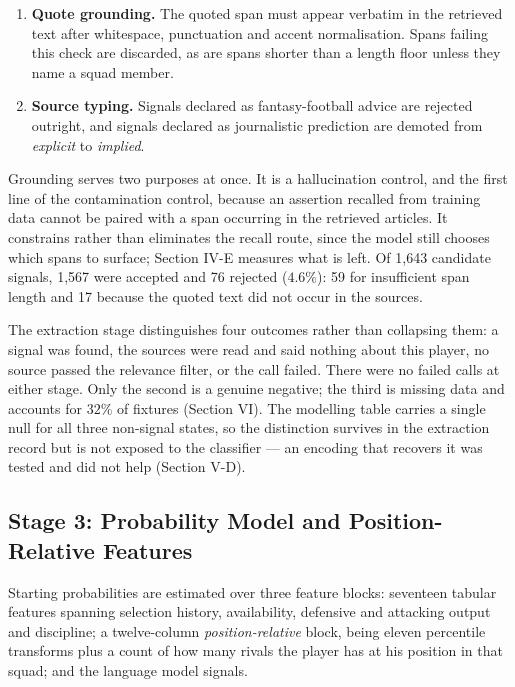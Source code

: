 \documentclass[conference]{IEEEtran}
\begin{document}
\begin{enumerate}
    \item[(a)] \textbf{Quote grounding.} The quoted span must appear verbatim in the retrieved text after whitespace, punctuation and accent normalisation. Spans failing this check are discarded, as are spans shorter than a length floor unless they name a squad member.
    \item[(b)] \textbf{Source typing.} Signals declared as fantasy-football advice are rejected outright, and signals declared as journalistic prediction are demoted from \emph{explicit} to \emph{implied}.
\end{enumerate}

Grounding serves two purposes at once. It is a hallucination control, and the first line of the contamination control, because an assertion recalled from training data cannot be paired with a span occurring in the retrieved articles. It constrains rather than eliminates the recall route, since the model still chooses which spans to surface; Section IV-E measures what is left. Of 1{,}643 candidate signals, 1{,}567 were accepted and 76 rejected ($4.6\%$): 59 for insufficient span length and 17 because the quoted text did not occur in the sources.

The extraction stage distinguishes four outcomes rather than collapsing them: a signal was found, the sources were read and said nothing about this player, no source passed the relevance filter, or the call failed. There were no failed calls at either stage. Only the second is a genuine negative; the third is missing data and accounts for $32\%$ of fixtures (Section VI). The modelling table carries a single null for all three non-signal states, so the distinction survives in the extraction record but is not exposed to the classifier --- an encoding that recovers it was tested and did not help (Section V-D).

\subsection{Stage 3: Probability Model and Position-Relative Features}

Starting probabilities are estimated over three feature blocks: seventeen tabular features spanning selection history, availability, defensive and attacking output and discipline; a twelve-column \emph{position-relative} block, being eleven percentile transforms plus a count of how many rivals the player has at his position in that squad; and the language model signals.
\end{document}
